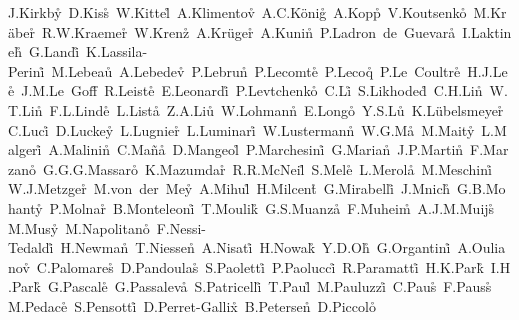 \documentclass[12pt,a4paper,dvips]{article}
\begin{document}
{J.Kirkby\r\tute\cern\
D.Kiss\r\tute\budapest\
W.Kittel\r\tute\nymegen\
A.Klimentov\r\tute{\mit,\moscow}\ 
A.C.K{\"o}nig\r\tute\nymegen\
A.Kopp\r\tute\zeuthen\
V.Koutsenko\r\tute{\mit,\moscow}\ 
M.Kr{\"a}ber\r\tute\eth\ 
R.W.Kraemer\r\tute\cmu\
W.Krenz\r\tute\aachen\ 
A.Kr{\"u}ger\r\tute\zeuthen\ 
A.Kunin\r\tute{\mit,\moscow}\ 
P.Ladron~de~Guevara\r\tute{\madrid}\
I.Laktineh\r\tute\lyon\
G.Landi\r\tute\florence\
K.Lassila-Perini\r\tute\eth\
M.Lebeau\r\tute\cern\
A.Lebedev\r\tute\mit\
P.Lebrun\r\tute\lyon\
P.Lecomte\r\tute\eth\ 
P.Lecoq\r\tute\cern\ 
P.Le~Coultre\r\tute\eth\ 
H.J.Lee\r\tute\berlin\
J.M.Le~Goff\r\tute\cern\
R.Leiste\r\tute\zeuthen\ 
E.Leonardi\r\tute\rome\
P.Levtchenko\r\tute\peters\
C.Li\r\tute\hefei\ 
S.Likhoded\r\tute\zeuthen\ 
C.H.Lin\r\tute\taiwan\
W.T.Lin\r\tute\taiwan\
F.L.Linde\r\tute{\nikhef}\
L.Lista\r\tute\naples\
Z.A.Liu\r\tute\beijing\
W.Lohmann\r\tute\zeuthen\
E.Longo\r\tute\rome\ 
Y.S.Lu\r\tute\beijing\ 
K.L\"ubelsmeyer\r\tute\aachen\
C.Luci\r\tute{\cern,\rome}\ 
D.Luckey\r\tute{\mit}\
L.Lugnier\r\tute\lyon\ 
L.Luminari\r\tute\rome\
W.Lustermann\r\tute\eth\
W.G.Ma\r\tute\hefei\ 
M.Maity\r\tute\tata\
L.Malgeri\r\tute\cern\
A.Malinin\r\tute{\cern}\ 
C.Ma\~na\r\tute\madrid\
D.Mangeol\r\tute\nymegen\
P.Marchesini\r\tute\eth\ 
G.Marian\r\tute\debrecen\ 
J.P.Martin\r\tute\lyon\ 
F.Marzano\r\tute\rome\ 
G.G.G.Massaro\r\tute\nikhef\ 
K.Mazumdar\r\tute\tata\
R.R.McNeil\r\tute{\lsu}\ 
S.Mele\r\tute\cern\
L.Merola\r\tute\naples\ 
M.Meschini\r\tute\florence\ 
W.J.Metzger\r\tute\nymegen\
M.von~der~Mey\r\tute\aachen\
A.Mihul\r\tute\bucharest\
H.Milcent\r\tute\cern\
G.Mirabelli\r\tute\rome\ 
J.Mnich\r\tute\cern\
G.B.Mohanty\r\tute\tata\ 
P.Molnar\r\tute\berlin\
B.Monteleoni\r\tute{\florence,\dag}\ 
T.Moulik\r\tute\tata\
G.S.Muanza\r\tute\lyon\
F.Muheim\r\tute\geneva\
A.J.M.Muijs\r\tute\nikhef\
M.Musy\r\tute\rome\ 
M.Napolitano\r\tute\naples\
F.Nessi-Tedaldi\r\tute\eth\
H.Newman\r\tute\caltech\ 
T.Niessen\r\tute\aachen\
A.Nisati\r\tute\rome\
H.Nowak\r\tute\zeuthen\                    
Y.D.Oh\r\tute\korea\
G.Organtini\r\tute\rome\
A.Oulianov\r\tute\moscow\ 
C.Palomares\r\tute\madrid\
D.Pandoulas\r\tute\aachen\ 
S.Paoletti\r\tute{\rome,\cern}\
P.Paolucci\r\tute\naples\
R.Paramatti\r\tute\rome\ 
H.K.Park\r\tute\cmu\
I.H.Park\r\tute\korea\
G.Pascale\r\tute\rome\
G.Passaleva\r\tute{\cern}\
S.Patricelli\r\tute\naples\ 
T.Paul\r\tute\ne\
M.Pauluzzi\r\tute\perugia\
C.Paus\r\tute\cern\
F.Pauss\r\tute\eth\
M.Pedace\r\tute\rome\
S.Pensotti\r\tute\milan\
D.Perret-Gallix\r\tute\lapp\ 
B.Petersen\r\tute\nymegen\
D.Piccolo\r\tute\naples\ 
}
\end{document}
